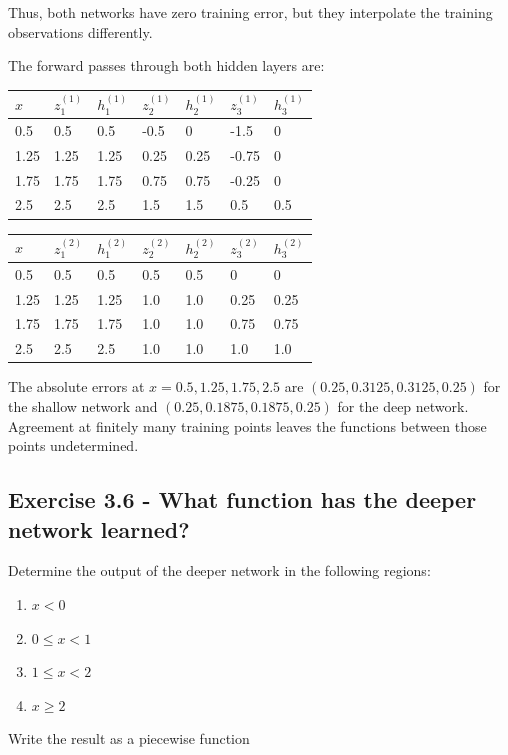 \documentclass[10pt]{article}
\begin{document}
Thus, both networks have zero training error, but they interpolate the training observations differently.


The forward passes through both hidden layers are:

\begin{center}
\begingroup
\small
\setlength{\tabcolsep}{4pt}
\begin{tabular}{l|l|l|l|l|l|l}
$x$ & $z^{(1)}_1$ & $h^{(1)}_1$ & $z^{(1)}_2$ & $h^{(1)}_2$ & $z^{(1)}_3$ & $h^{(1)}_3$ \\ \hline
0.5 & 0.5 & 0.5 & -0.5 & 0 & -1.5 & 0 \\[1.5pt]
1.25 & 1.25 & 1.25 & 0.25 & 0.25 & -0.75 & 0 \\[1.5pt]
1.75 & 1.75 & 1.75 & 0.75 & 0.75 & -0.25 & 0 \\[1.5pt]
2.5 & 2.5 & 2.5 & 1.5 & 1.5 & 0.5 & 0.5 \\[1.5pt]
\end{tabular}
\endgroup
\end{center}

\begin{center}
\begingroup
\small
\setlength{\tabcolsep}{4pt}
\begin{tabular}{l|l|l|l|l|l|l}
$x$ & $z^{(2)}_1$ & $h^{(2)}_1$ & $z^{(2)}_2$ & $h^{(2)}_2$ & $z^{(2)}_3$ & $h^{(2)}_3$ \\ \hline
0.5 & 0.5 & 0.5 & 0.5 & 0.5 & 0 & 0 \\[1.5pt]
1.25 & 1.25 & 1.25 & 1.0 & 1.0 & 0.25 & 0.25 \\[1.5pt]
1.75 & 1.75 & 1.75 & 1.0 & 1.0 & 0.75 & 0.75 \\[1.5pt]
2.5 & 2.5 & 2.5 & 1.0 & 1.0 & 1.0 & 1.0 \\[1.5pt]
\end{tabular}
\endgroup
\end{center}
The absolute errors at $x=0.5,1.25,1.75,2.5$ are $(0.25,0.3125,0.3125,0.25)$ for the shallow network and $(0.25,0.1875,0.1875,0.25)$ for the deep network. Agreement at finitely many training points leaves the functions between those points undetermined.
\par\endgroup

\subsection*{Exercise 3.6 - What function has the deeper network learned?}
Determine the output of the deeper network in the following regions:

\begin{enumerate}
\item
$x<0$

\item
$0\leq x<1$

\item
$1\leq x<2$

\item
$x\geq2$

\end{enumerate}
Write the result as a piecewise function
\end{document}
